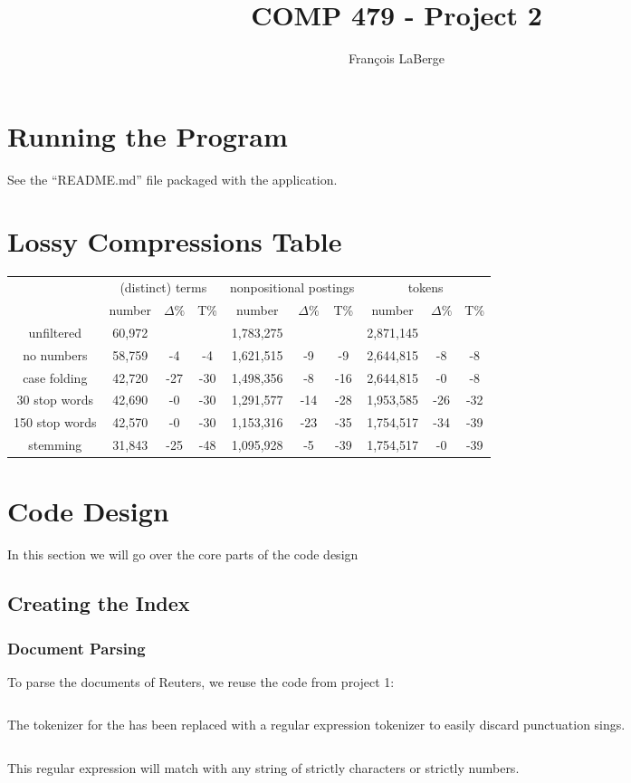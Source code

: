 \documentclass[]{article}
\title{COMP 479 - Project 2}
\author{François LaBerge}
\begin{document}
\maketitle

\section{Running the Program}
See the ``README.md'' file packaged with the application.

\section{Lossy Compressions Table}
\begin{center}
\begin{tabular}{ |c|c c c c c c c c c| } 
	\hline
	& \multicolumn{3}{c}{(distinct) terms} & \multicolumn{3}{c}{nonpositional postings} & \multicolumn{3}{c|}{tokens}\\
	& number & $\Delta\%$ & T\% & number & $\Delta\%$ & T\% & number & $\Delta\%$ & T\% \\
	\hline
	unfiltered		& 60,972 & & & 1,783,275& & & 2,871,145 & &\\
	no numbers 		& 58,759 & -4  & -4  & 1,621,515 & -9  & -9  & 2,644,815 & -8  & -8\\
	case folding	& 42,720 & -27 & -30 & 1,498,356 & -8  & -16 & 2,644,815 & -0  & -8\\
	30 stop words	& 42,690 & -0  & -30 & 1,291,577 & -14 & -28 & 1,953,585 & -26 & -32\\
	150 stop words	& 42,570 & -0  & -30 & 1,153,316 & -23 & -35 & 1,754,517 & -34 & -39\\
	stemming		& 31,843 & -25 & -48 & 1,095,928 & -5  & -39 & 1,754,517 & -0  & -39\\
	\hline
\end{tabular}
\end{center}

\newpage

\section{Code Design}
	In this section we will go over the core parts of the code design
	\subsection{Creating the Index}
		\subsubsection{Document Parsing}
			To parse the documents of Reuters, we reuse the code from project 1:
			\inputminted{python}{codesnippets/parser.txt}
			The tokenizer for the has been replaced with a regular expression tokenizer to easily discard punctuation sings.
			\inputminted{python}{codesnippets/tokenizer.txt}
			This regular expression will match with any string of strictly characters or strictly numbers.
		
\end{document}
